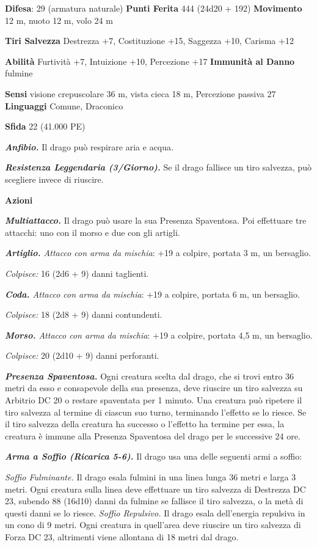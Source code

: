 \begin{multicols}{2}
\textbf{Difesa}: 29 (armatura naturale) \textbf{Punti Ferita}
444 (24d20 + 192) \textbf{Movimento} 12 m, nuoto 12 m, volo 24 m

\textbf{Tiri Salvezza} Destrezza +7, Costituzione +15, Saggezza +10,
Carisma +12

\textbf{Abilità} Furtività +7, Intuizione +10, Percezione +17
\textbf{Immunità al Danno} fulmine

\textbf{Sensi} visione crepuscolare 36 m, vista cieca 18 m, Percezione passiva
27 \textbf{Linguaggi} Comune, Draconico

\textbf{Sfida} 22 (41.000 PE)

\emph{\textbf{Anfibio.}} Il drago può respirare aria e acqua.

\emph{\textbf{Resistenza Leggendaria (3/Giorno).}} Se il drago fallisce
un tiro salvezza, può scegliere invece di riuscire.

\textbf{Azioni}

\emph{\textbf{Multiattacco.}} Il drago può usare la sua Presenza
Spaventosa. Poi effettuare tre attacchi: uno con il morso e due con gli
artigli.

\emph{\textbf{Artiglio.} Attacco con arma da mischia}: +19 a colpire,
portata 3 m, un bersaglio.

\emph{Colpisce:} 16 (2d6 + 9) danni taglienti.

\emph{\textbf{Coda.} Attacco con arma da mischia}: +19 a colpire,
portata 6 m, un bersaglio.

\emph{Colpisce:} 18 (2d8 + 9) danni contundenti.

\emph{\textbf{Morso.} Attacco con arma da mischia}: +19 a colpire,
portata 4,5 m, un bersaglio.

\emph{Colpisce:} 20 (2d10 + 9) danni perforanti.

\emph{\textbf{Presenza Spaventosa.}} Ogni creatura scelta dal drago, che
si trovi entro 36 metri da esso e consapevole della sua presenza, deve
riuscire un tiro salvezza su Arbitrio DC 20 o restare spaventata per 1
minuto. Una creatura può ripetere il tiro salvezza al termine di ciascun
suo turno, terminando l'effetto se lo riesce. Se il tiro salvezza della
creatura ha successo o l'effetto ha termine per essa, la creatura è
immune alla Presenza Spaventosa del drago per le successive 24 ore.

\emph{\textbf{Arma a Soffio (Ricarica 5-6).}} Il drago usa una delle
seguenti armi a soffio:

\emph{Soffio Fulminante.} Il drago esala fulmini in una linea lunga 36
metri e larga 3 metri. Ogni creatura sulla linea deve effettuare un tiro
salvezza di Destrezza DC 23, subendo 88 (16d10) danni da fulmine se
fallisce il tiro salvezza, o la metà di questi danni se lo riesce.
\emph{Soffio Repulsivo.} Il drago esala dell'energia repulsiva in un
cono di 9 metri. Ogni creatura in quell'area deve riuscire un tiro
salvezza di Forza DC 23, altrimenti viene allontana di 18 metri dal
drago.


\end{multicols}
